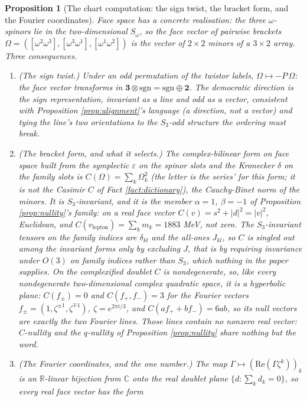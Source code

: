 \documentclass[11pt]{article}
\newtheorem{proposition}[theorem]{Proposition}
\theoremstyle{definition}
\newcommand{\R}{\mathbb{R}}
\newcommand{\C}{\mathbb{C}}
\begin{document}
\begin{proposition}[The chart computation: the sign twist, the bracket form, and the Fourier coordinates]\label{prop:chart}
Face space has a concrete realisation: the three $\omega$-spinors lie in the two-dimensional $S_{\omega}$, so the face vector of pairwise brackets $\Omega = ([\omega^{2}\omega^{3}], [\omega^{3}\omega^{1}], [\omega^{1}\omega^{2}])$ is the vector of $2 \times 2$ minors of a $3 \times 2$ array. Three consequences.
\begin{enumerate}
\item \emph{(The sign twist.)} Under an odd permutation of the twistor labels, $\Omega \mapsto -P\,\Omega$: the face vector transforms in $\mathbf{3} \otimes \mathrm{sgn} = \mathrm{sgn} \oplus \mathbf{2}$. The democratic direction is the sign representation, invariant as a line and odd as a vector, consistent with Proposition \ref{prop:alignment}'s language (a direction, not a vector) and tying the line's two orientations to the $S_{3}$-odd structure the ordering must break.
\item \emph{(The bracket form, and what it selects.)} The complex-bilinear form on face space built from the symplectic $\varepsilon$ on the spinor slots and the Kronecker $\delta$ on the family slots is $C(\Omega) = \sum_{k}\Omega_{k}^{2}$ (the letter is the series' for this form; it is not the Casimir $C$ of Fact \ref{fact:dictionary}), the Cauchy-Binet norm of the minors. It is $S_{3}$-invariant, and it is the member $\alpha = 1$, $\beta = -1$ of Proposition \ref{prop:nullity}'s family: on a real face vector $C(v) = s^{2} + |d|^{2} = |v|^{2}$, Euclidean, and $C(v_{\mathrm{lepton}}) = \sum_{k} m_{k} = 1883$ MeV, not zero. The $S_{3}$-invariant tensors on the family indices are $\delta_{kl}$ and the all-ones $J_{kl}$, so $C$ is singled out among the invariant forms only by excluding $J$, that is by requiring invariance under $O(3)$ on family indices rather than $S_{3}$, which nothing in the paper supplies. On the complexified doublet $C$ is nondegenerate, so, like every nondegenerate two-dimensional complex quadratic space, it is a hyperbolic plane: $C(f_{\pm}) = 0$ and $C(f_{+}, f_{-}) = 3$ for the Fourier vectors $f_{\pm} = (1, \zeta^{\pm 1}, \zeta^{\mp 1})$, $\zeta = e^{2\pi i/3}$, and $C(af_{+} + bf_{-}) = 6ab$, so its null vectors are exactly the two Fourier lines. Those lines contain no nonzero real vector: $C$-nullity and the $q$-nullity of Proposition \ref{prop:nullity} share nothing but the word.
\item \emph{(The Fourier coordinates, and the one number.)} The map $\Gamma \mapsto (\mathrm{Re}(\Gamma\zeta^{k}))_{k}$ is an $\R$-linear bijection from $\C$ onto the real doublet plane $\{d : \sum_{k} d_{k} = 0\}$, so every real face vector has the form

\end{enumerate}
\end{proposition}
\end{document}
